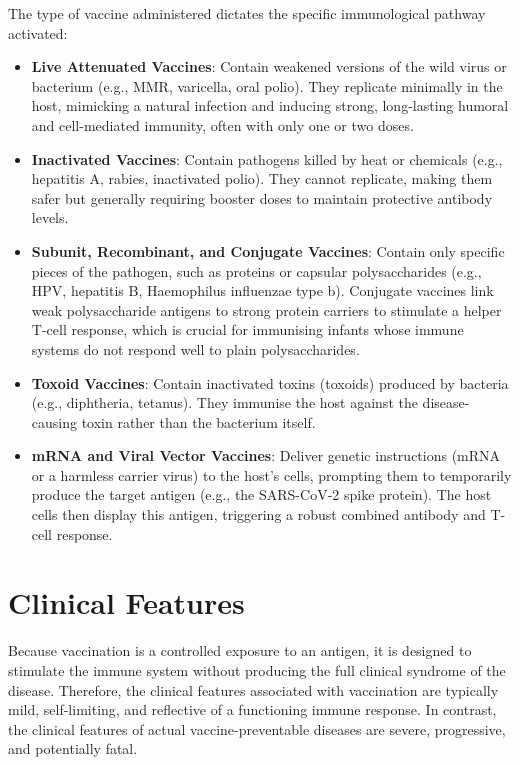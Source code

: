 The type of vaccine administered dictates the specific immunological pathway activated:
\begin{itemize}
    \item \textbf{Live Attenuated Vaccines}: Contain weakened versions of the wild virus or bacterium (e.g., MMR, varicella, oral polio). They replicate minimally in the host, mimicking a natural infection and inducing strong, long-lasting humoral and cell-mediated immunity, often with only one or two doses.
    \item \textbf{Inactivated Vaccines}: Contain pathogens killed by heat or chemicals (e.g., hepatitis A, rabies, inactivated polio). They cannot replicate, making them safer but generally requiring booster doses to maintain protective antibody levels.
    \item \textbf{Subunit, Recombinant, and Conjugate Vaccines}: Contain only specific pieces of the pathogen, such as proteins or capsular polysaccharides (e.g., HPV, hepatitis B, Haemophilus influenzae type b). Conjugate vaccines link weak polysaccharide antigens to strong protein carriers to stimulate a helper T-cell response, which is crucial for immunising infants whose immune systems do not respond well to plain polysaccharides.
    \item \textbf{Toxoid Vaccines}: Contain inactivated toxins (toxoids) produced by bacteria (e.g., diphtheria, tetanus). They immunise the host against the disease-causing toxin rather than the bacterium itself.
    \item \textbf{mRNA and Viral Vector Vaccines}: Deliver genetic instructions (mRNA or a harmless carrier virus) to the host's cells, prompting them to temporarily produce the target antigen (e.g., the SARS-CoV-2 spike protein). The host cells then display this antigen, triggering a robust combined antibody and T-cell response.
\end{itemize}

\section*{Clinical Features}
Because vaccination is a controlled exposure to an antigen, it is designed to stimulate the immune system without producing the full clinical syndrome of the disease. Therefore, the clinical features associated with vaccination are typically mild, self-limiting, and reflective of a functioning immune response. In contrast, the clinical features of actual vaccine-preventable diseases are severe, progressive, and potentially fatal.

